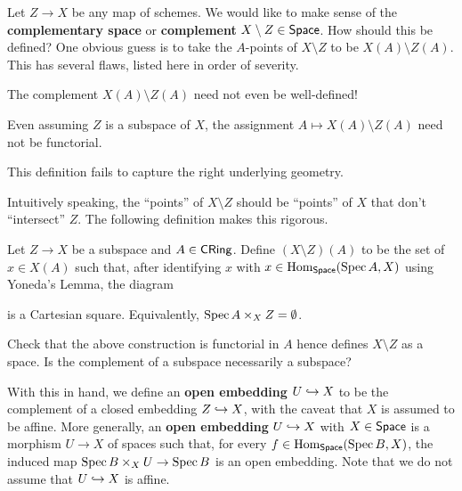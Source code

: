 \documentclass[11pt]{article}
\begin{document}
Let $Z\to X$ be any map of schemes. We would like to make sense of the \textbf{complementary space} or \textbf{complement} $X\setminus Z\in\operatorname{\mathsf{Space}}$. How should this be defined? One obvious guess is to take the $A$-points of $X\setminus Z$ to be $X(A)\setminus Z(A)$. This has several flaws, listed here in order of severity.
\begin{enum}{\arabic}
\item The complement $X(A)\setminus Z(A)$ need not even be well-defined!

\item Even assuming $Z$ is a subspace of $X$, the assignment $A\mapsto X(A)\setminus Z(A)$ need not be functorial.

\item This definition fails to capture the right underlying geometry.
\end{enum}

Intuitively speaking, the ``points'' of $X\setminus Z$ should be ``points'' of $X$ that don't ``intersect'' $Z$. The following definition makes this rigorous.

\begin{definition}
Let $Z\to X$ be a subspace and $A\in\operatorname{\mathsf{CRing}}$. Define $(X\setminus Z)(A)$ to be the set of $x\in X(A)$ such that, after identifying $x$ with $x\in\operatorname{Hom}_{\operatorname{\mathsf{Space}}}(\operatorname{Spec} A,X)$ using Yoneda's Lemma, the diagram
\begin{center}
\end{center}
is a Cartesian square. Equivalently, $\operatorname{Spec} A\times_XZ=\emptyset$.
\end{definition}

\begin{exercise}
Check that the above construction is functorial in $A$ hence defines $X\setminus Z$ as a space. Is the complement of a subspace necessarily a subspace?
\end{exercise}

With this in hand, we define an \textbf{open embedding} $U\hookrightarrow X$ to be the complement of a closed embedding $Z\hookrightarrow X$, with the caveat that $X$ is assumed to be affine. More generally, an \textbf{open embedding} $U\hookrightarrow X$ with $X\in\operatorname{\mathsf{Space}}$ is a morphism $U\to X$ of spaces such that, for every $f\in\operatorname{Hom}_{\operatorname{\mathsf{Space}}}(\operatorname{Spec} B,X)$, the induced map $\operatorname{Spec} B\times_XU\to\operatorname{Spec} B$ is an open embedding. Note that we do not assume that $U\hookrightarrow X$ is affine.
\end{document}
